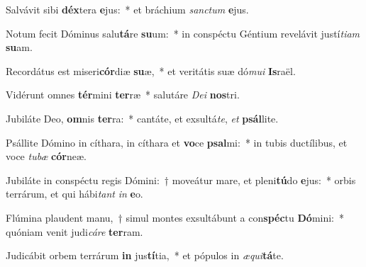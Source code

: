 \item Salvávit sibi \textbf{déx}tera \textbf{e}jus:~* et bráchium \textit{sanc}\textit{tum} \textbf{e}jus.
\item Notum fecit Dóminus salu\textbf{tá}re \textbf{su}um:~* in conspéctu Géntium revelávit justí\textit{ti}\textit{am} \textbf{su}am.
\item Recordátus est miseri\textbf{cór}diæ \textbf{su}æ,~* et veritátis suæ dó\textit{mu}\textit{i} \textbf{Is}raël.
\item Vidérunt omnes \textbf{tér}mini \textbf{ter}ræ~* salutáre \textit{De}\textit{i} \textbf{nos}tri.
\item Jubiláte Deo, \textbf{om}nis \textbf{ter}ra:~* cantáte, et exsultá\textit{te}, \textit{et} \textbf{psál}lite.
\item Psállite Dómino in cíthara, in cíthara et \textbf{vo}ce \textbf{psal}mi:~* in tubis ductílibus, et voce \textit{tu}\textit{bæ} \textbf{cór}neæ.
\item Jubiláte in conspéctu regis Dómini:~† moveátur mare, et pleni\textbf{tú}do \textbf{e}jus:~* orbis terrárum, et qui hábi\textit{tant} \textit{in} \textbf{e}o.
\item Flúmina plaudent manu,~† simul montes exsultábunt a con\textbf{spéc}tu \textbf{Dó}mini:~* quóniam venit judi\textit{cá}\textit{re} \textbf{ter}ram.
\item Judicábit orbem terrárum \textbf{in} jus\textbf{tí}tia,~* et pópulos in \textit{æ}\textit{qui}\textbf{tá}te.
